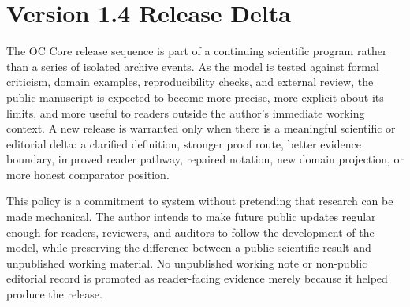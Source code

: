 \begin{abstract}
The manuscript contains the full monograph body, a compact article route, a
methods and reproducibility route, reviewer-response material, proof and
formalization sections, finite-model and numerical evidence anchors, figure and
table material, source-trace appendices, and practical-use boundaries. Figures
and tables are retained as scientific material; formulas and theorem statements
are retained in the mathematical spine; machine-readable registers remain in
the evidence package where they can be audited without becoming the narrative
structure of the manuscript.

The practical value of the release is a disciplined compression without loss of
meaning. If OC is useful, it should help a scientific reviewer, a systems
theorist, an AI builder, an enterprise architect, or an evidence auditor
translate a complex system into a common ontology while preserving the
differences that matter. The principal limitation is part of the method:
future releases must add evidence, mechanization, comparator work, or domain
validation before they widen the public claim surface. Version~1.4 therefore
offers a publication-grade basis for external review, not a claim that every
future scientific obligation has already been discharged.
\end{abstract}

\clearpage
\section*{Version 1.4 Release Delta}
{}
The OC Core release sequence is part of a continuing scientific program rather
than a series of isolated archive events. As the model is tested against formal
criticism, domain examples, reproducibility checks, and external review, the
public manuscript is expected to become more precise, more explicit about its
limits, and more useful to readers outside the author's immediate working
context. A new release is warranted only when there is a meaningful scientific
or editorial delta: a clarified definition, stronger proof route, better
evidence boundary, improved reader pathway, repaired notation, new domain
projection, or more honest comparator position.

This policy is a commitment to system without pretending that research can be
made mechanical. The author intends to make future public updates regular
enough for readers, reviewers, and auditors to follow the development of the
model, while preserving the difference between a public scientific result and
unpublished working material. No unpublished working note or non-public editorial
record is promoted as reader-facing evidence merely because it
helped produce the release.

